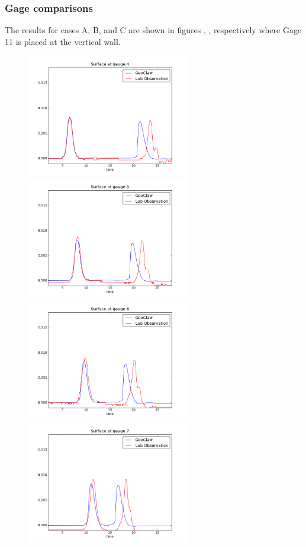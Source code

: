 \subsubsection{Gage comparisons}
The results for cases A, B, and C are shown in figures , ,  respectively where Gage 11 is placed at the vertical wall.

\begin{figure}[ht]
\hfil\includegraphics[width=2.8in]{bp5/CaseA/gauge0004fig300.png}\hfil
\hfil\includegraphics[width=2.8in]{bp5/CaseA/gauge0005fig300.png}\hfil
\vskip 5pt
\hfil\includegraphics[width=2.8in]{bp5/CaseA/gauge0006fig300.png}\hfil
\hfil\includegraphics[width=2.8in]{bp5/CaseA/gauge0007fig300.png}\hfil

\end{figure}
